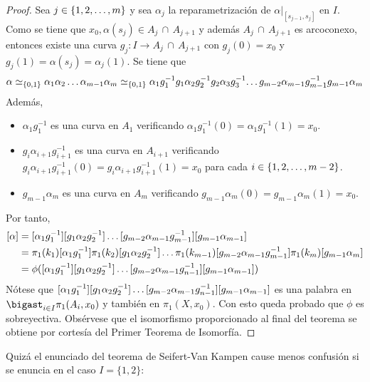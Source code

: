 \documentclass[11pt]{report}
\theoremstyle{definition}
\theoremstyle{definition}
\theoremstyle{remark}
\begin{document}
\begin{proof}
Sea $j \in \{1,2,\mathellipsis,m\}$ y sea $\alpha_j$ la reparametrización de $\alpha |_{[s_{j-1},s_j]}$ en $I$. Como se tiene que $x_0,\alpha(s_j) \in A_j \,\cap \, A_{j+1}$ y además $A_j \,\cap\, A_{j+1}$ es arcoconexo, entonces existe una curva $g_j \colon I \to A_j \,\cap\, A_{j+1}$ con $g_j(0) = x_0$ y $g_j(1)=\alpha(s_j)=\alpha_j(1)$. Se tiene que
\[\alpha \simeq_{\{0,1\}} \alpha_1\alpha_2\mathellipsis\alpha_{m-1}\alpha_m \simeq_{\{0,1\}} \alpha_1g_1^{-1}g_1\alpha_2g_2^{-1}g_2\alpha_3 g_{3}^{-1} \!\mathellipsis g_{m-2}\alpha_{m-1}g_{m-1}^{-1}g_{m-1}\alpha_m\]
Además, 
\begin{itemize}
    \item $\alpha_1g_1^{-1}$ es una curva en $A_1$ verificando $\alpha_1g_1^{-1}(0)=\alpha_1g_1^{-1}(1)=x_0$.
    \item $g_i\alpha_{i+1}g_{i+1}^{-1}$ es una curva en $A_{i+1}$ verificando $g_i\alpha_{i+1}g_{i+1}^{-1}(0)=g_i\alpha_{i+1}g_{i+1}^{-1}(1)=x_0$ para cada $i \in \{1,2,\mathellipsis,m-2\}$.
    \item $g_{m-1}\alpha_m$ es una curva en $A_m$ verificando $g_{m-1}\alpha_m(0)=g_{m-1}\alpha_m(1)=x_0$.
\end{itemize}
Por tanto,
\[
\begin{aligned}[t]
[\alpha] &= [\alpha_1g_1^{-1}][g_1\alpha_2g_2^{-1}]\mathellipsis[g_{m-2}\alpha_{m-1}g_{m-1}^{-1}][g_{m-1}\alpha_{m-1}] \\
&= \pi_1(k_1)[\alpha_1g_1^{-1}]\pi_1(k_2)[g_1\alpha_2g_2^{-1}]\mathellipsis \pi_1(k_{m-1})[g_{m-2}\alpha_{m-1}g_{m-1}^{-1}]\pi_1(k_{m})[g_{m-1}\alpha_m] \\
&= \phi([\alpha_1g_1^{-1}][g_1\alpha_2g_2^{-1}]\mathellipsis[g_{m-2}\alpha_{m-1}g_{n-1}^{-1}][g_{m-1}\alpha_{m-1}])
\end{aligned}
\]
Nótese que $[\alpha_1g_1^{-1}][g_1\alpha_2g_2^{-1}]\mathellipsis[g_{m-2}\alpha_{m-1}g_{n-1}^{-1}][g_{m-1}\alpha_{m-1}]$
es una palabra en $\bigast_{i \in I}\pi_1(A_i,x_0)$ y también en $\pi_1(X,x_0)$. Con esto queda probado que $\phi$ es sobreyectiva. Obsérvese que el isomorfismo proporcionado al final del teorema se obtiene por cortesía del Primer Teorema de Isomorfía.
\end{proof}

Quizá el enunciado del teorema de Seifert-Van Kampen cause menos confusión si se enuncia en el caso $I = \{1,2\}$:
\end{document}
